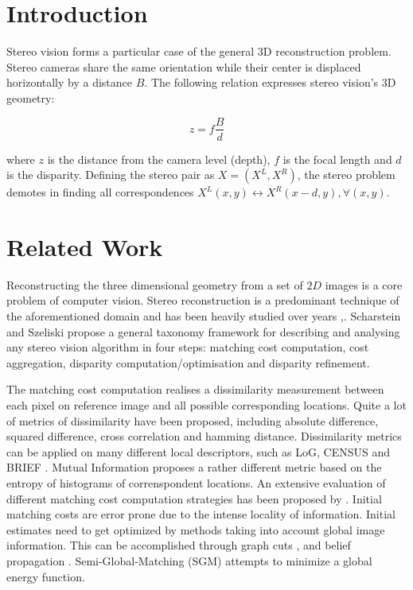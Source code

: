 \documentclass[runningheads]{llncs}
\begin{document}
\section{Introduction}

Stereo vision forms a particular case of the general 3D reconstruction problem. Stereo cameras share the same orientation while their center is displaced horizontally by a distance $B$. The following relation expresses stereo vision's 3D geometry:

\begin{equation} \label{eq:stereo_geometry}
z = f\frac{B}{d}
\end{equation}

where $z$ is the distance from the camera level (depth), $f$ is the focal length and $d$ is the disparity. Defining the stereo pair as $X = (X^L, X^R)$, the stereo problem demotes in finding all correspondences $X^L(x,y) \leftrightarrow X^R(x-d, y), \forall (x,y)$.

\section{Related Work}

Reconstructing the three dimensional geometry from a set of $2D$ images is a core problem of computer vision. Stereo reconstruction is a predominant technique of the aforementioned domain and has been heavily studied over years \cite{Barnard1982ComputationalStereo},\cite{Brown2003}. Scharstein and Szeliski \cite{Scharstein2001AAlgorithms} propose a general taxonomy framework for describing and analysing any stereo vision algorithm in four steps: matching cost computation, cost aggregation, disparity computation/optimisation and disparity refinement.

The matching cost computation realises a dissimilarity measurement between each pixel on reference image and all possible corresponding locations. Quite a lot of metrics of dissimilarity have been proposed, including  absolute difference, squared difference, cross correlation and hamming distance. Dissimilarity metrics can be applied on many different local descriptors, such as LoG, CENSUS \cite{Zabih1996ACorrespondence} and BRIEF \cite{Calonder2010}. Mutual Information \cite{Viola1997} proposes a rather different metric based on the entropy of histograms of correnspondent locations. An extensive evaluation of different matching cost computation strategies has been proposed by \cite{Hirschmuller2007}. Initial matching costs are error prone due to the intense locality of information. Initial estimates need to get optimized by methods taking into account global image information. This can be accomplished through graph cuts \cite{Kolmogorov}, \cite{Boykov2001} and belief propagation \cite{Klaus2006}. Semi-Global-Matching (SGM) \cite{Hirschmuller2008StereoInformation} attempts to minimize a global energy function.
\end{document}
